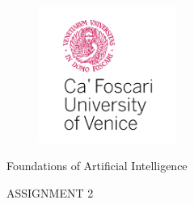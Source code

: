 \begin{titlepage}

\begin{figure}[h]
    \includegraphics[width=0.40\textwidth]{images/unive_logo_2.png}
\end{figure}

\begin{center}
    \vspace*{.08\textheight}
    {\textnormal{\LARGE {Foundations of Artificial Intelligence}}\par}
	\vspace{20mm}
	\fontsize{10mm}{8mm}\selectfont 
    \textup{ASSIGNMENT 2}
\end{center}

\vspace{.075\textheight}




\end{titlepage}